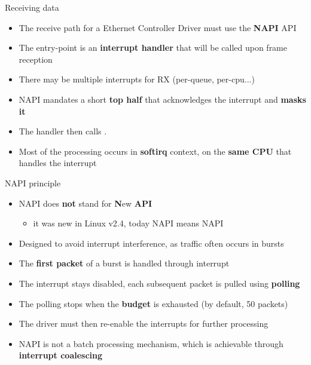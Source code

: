 \begin{frame}{Receiving data}
	\begin{itemize}
		\item The receive path for a Ethernet Controller Driver must use the \textbf{NAPI} API
		\item The entry-point is an \textbf{interrupt handler} that will be called upon frame reception
		\item There may be multiple interrupts for RX (per-queue, per-cpu...)
		\item NAPI mandates a short \textbf{top half} that acknowledges the interrupt and \textbf{masks it}
		\item The handler then calls .
		\item Most of the processing occurs in \textbf{softirq} context, on the \textbf{same CPU} that handles the interrupt
	\end{itemize}
\end{frame}

\begin{frame}{NAPI principle}
	\begin{itemize}
		\item NAPI does \textbf{not} stand for \textbf{N}ew \textbf{API}
			\begin{itemize}
				\item it was new in Linux v2.4, today NAPI means NAPI
			\end{itemize}
		\item Designed to avoid interrupt interference, as traffic often occurs in bursts
		\item The \textbf{first packet} of a burst is handled through interrupt
		\item The interrupt stays disabled, each subsequent packet is pulled using \textbf{polling}
		\item The polling stops when the \textbf{budget} is exhausted (by default, 50 packets)
		\item The driver must then re-enable the interrupts for further processing
		\item NAPI is not a batch processing mechanism, which is achievable through \textbf{interrupt coalescing}
	\end{itemize}
\end{frame}

